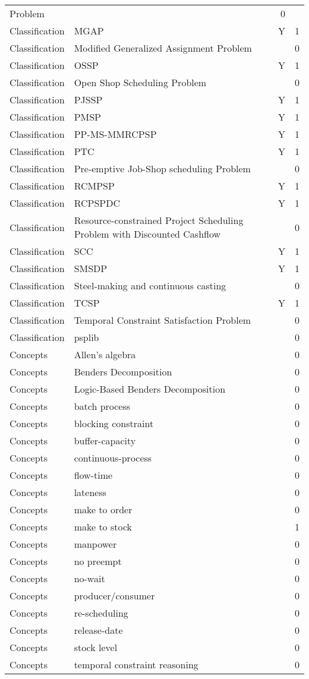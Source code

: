 {\begin{longtable}{lp{10cm}rr}
Problem &  & 0\\Classification & MGAP & Y & 1\\Classification & Modified Generalized Assignment Problem &  & 0\\Classification & OSSP & Y & 1\\Classification & Open Shop Scheduling Problem &  & 0\\Classification & PJSSP & Y & 1\\Classification & PMSP & Y & 1\\Classification & PP-MS-MMRCPSP & Y & 1\\Classification & PTC & Y & 1\\Classification & Pre-emptive Job-Shop scheduling Problem &  & 0\\Classification & RCMPSP & Y & 1\\Classification & RCPSPDC & Y & 1\\Classification & Resource-constrained Project Scheduling Problem with Discounted Cashflow &  & 0\\Classification & SCC & Y & 1\\Classification & SMSDP & Y & 1\\Classification & Steel-making and continuous casting &  & 0\\Classification & TCSP & Y & 1\\Classification & Temporal Constraint Satisfaction Problem &  & 0\\Classification & psplib &  & 0\\Concepts & Allen's algebra &  & 0\\Concepts & Benders Decomposition &  & 0\\Concepts & Logic-Based Benders Decomposition &  & 0\\Concepts & batch process &  & 0\\Concepts & blocking constraint &  & 0\\Concepts & buffer-capacity &  & 0\\Concepts & continuous-process &  & 0\\Concepts & flow-time &  & 0\\Concepts & lateness &  & 0\\Concepts & make to order &  & 0\\Concepts & make to stock &  & 1\\Concepts & manpower &  & 0\\Concepts & no preempt &  & 0\\Concepts & no-wait &  & 0\\Concepts & producer/consumer &  & 0\\Concepts & re-scheduling &  & 0\\Concepts & release-date &  & 0\\Concepts & stock level &  & 0\\Concepts & temporal constraint reasoning &  & 0\\\end{longtable}
}

